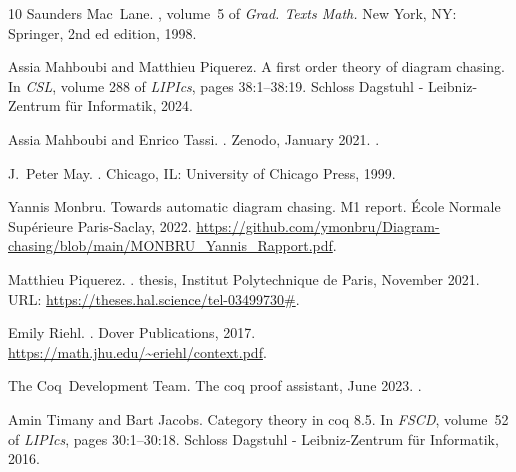 \documentclass[10pt,a4paper]{article}
\renewcommand{\~}{\widetilde}
\begin{document}
\begin{thebibliography}{10}
Saunders Mac~Lane.
, volume~5 of {\em
  Grad. Texts Math.}
\newblock New York, NY: Springer, 2nd ed edition, 1998.

Assia Mahboubi and Matthieu Piquerez.
\newblock A first order theory of diagram chasing.
\newblock In {\em {CSL}}, volume 288 of {\em LIPIcs}, pages 38:1--38:19.
  Schloss Dagstuhl - Leibniz-Zentrum f{\"{u}}r Informatik, 2024.

Assia Mahboubi and Enrico Tassi.
.
\newblock Zenodo, January 2021.
\newblock \href {https://doi.org/10.5281/zenodo.4457887}
  {}.

J.~Peter May.
.
\newblock Chicago, IL: University of Chicago Press, 1999.

Yannis Monbru.
\newblock Towards automatic diagram chasing.
\newblock M1 report. École Normale Supérieure Paris-Saclay, 2022.
\newblock
  \url{https://github.com/ymonbru/Diagram-chasing/blob/main/MONBRU_Yannis_Rapport.pdf}.

Matthieu Piquerez.
.
 thesis, {Institut Polytechnique de Paris}, November 2021.
\newblock URL: \url{https://theses.hal.science/tel-03499730#}.

Emily Riehl.
.
\newblock Dover Publications, 2017.
\newblock \url{https://math.jhu.edu/~eriehl/context.pdf}.

The Coq~Development Team.
\newblock The coq proof assistant, June 2023.
\newblock \href {https://doi.org/10.5281/zenodo.8161141}
  {}.

Amin Timany and Bart Jacobs.
\newblock Category theory in coq 8.5.
\newblock In {\em {FSCD}}, volume~52 of {\em LIPIcs}, pages 30:1--30:18.
  Schloss Dagstuhl - Leibniz-Zentrum f{\"{u}}r Informatik, 2016.

\end{thebibliography}
\end{document}
